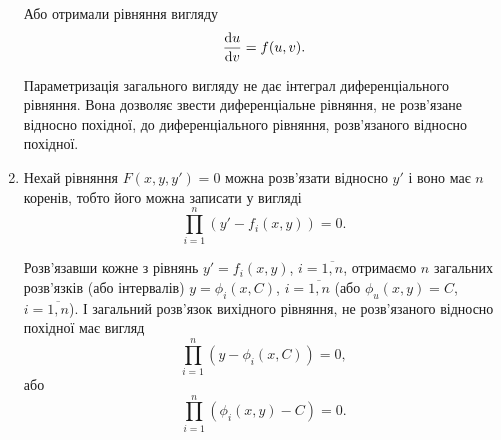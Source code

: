 \begin{enumerate}
	Або отримали рівняння вигляду
	\begin{equation*}
		\frac{\mathop{}\!\mathrm{d} u}{\mathop{}\!\mathrm{d} v} = f(u, v).
	\end{equation*}

	Параметризація загального вигляду не дає інтеграл диференціального рівняння. Вона дозволяє звести диференціальне рівняння, не роз\-в'яз\-а\-не відносно похідної, до диференціального рівняння, роз\-в'яз\-а\-но\-го відносно похідної.

	\item Нехай рівняння $F(x, y, y') = 0$ можна розв'язати відносно $y'$ і воно має $n$ коренів, тобто його  можна записати у вигляді  
	\begin{equation*}
		\prod_{i=1}^n (y' - f_i(x, y)) = 0.
	\end{equation*}
	
	Розв'язавши кожне з рівнянь $y' = f_i(x, y)$, $i=\overline{1,n}$, отримаємо $n$ загальних розв'язків (або інтервалів) $y = \phi_i(x, C)$, $i=\overline{1,n}$ (або $\phi_u(x,y)=C$, $i=\overline{1,n}$). І загальний розв'язок вихідного рівняння, не розв'язаного відносно похідної має вигляд
	\begin{equation*}
		\prod_{i=1}^n (y - \phi_i(x, C)) = 0,
	\end{equation*}
	або
	\begin{equation*}
		\prod_{i=1}^n (\phi_i(x, y) - C) = 0.
	\end{equation*}
\end{enumerate}
